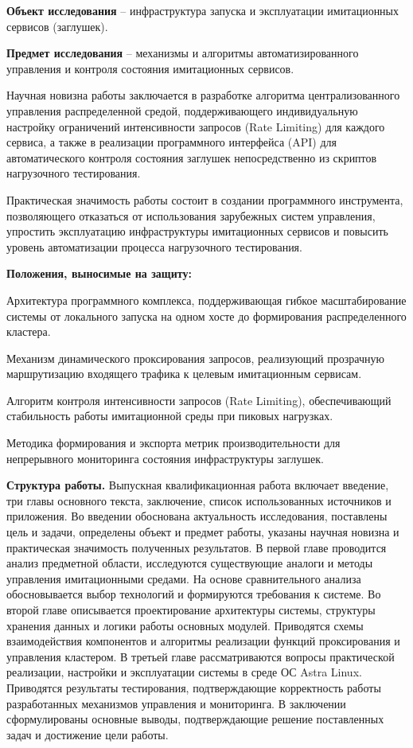 \textbf{Объект исследования} -- инфраструктура запуска и эксплуатации имитационных сервисов (заглушек).

\textbf{Предмет исследования} -- механизмы и алгоритмы автоматизированного управления и контроля состояния имитационных сервисов.

Научная новизна работы заключается в разработке алгоритма централизованного управления распределенной средой, поддерживающего индивидуальную настройку ограничений интенсивности запросов (Rate Limiting) для каждого сервиса, а также в реализации программного интерфейса (API) для автоматического контроля состояния заглушек непосредственно из скриптов нагрузочного тестирования.

Практическая значимость работы состоит в создании программного инструмента, позволяющего отказаться от использования зарубежных систем управления, упростить эксплуатацию инфраструктуры имитационных сервисов и повысить уровень автоматизации процесса нагрузочного тестирования.

\textbf{Положения, выносимые на защиту:}
\begin{compactlist}
  \item Архитектура программного комплекса, поддерживающая гибкое масштабирование системы от локального запуска на одном хосте до формирования распределенного кластера.
  \item Механизм динамического проксирования запросов, реализующий прозрачную маршрутизацию входящего трафика к целевым имитационным сервисам.
  \item Алгоритм контроля интенсивности запросов (Rate Limiting), обеспечивающий стабильность работы имитационной среды при пиковых нагрузках.
  \item Методика формирования и экспорта метрик производительности для непрерывного мониторинга состояния инфраструктуры заглушек.
\end{compactlist}

\textbf{Структура работы.} Выпускная квалификационная работа включает введение, три главы основного текста, заключение, список использованных источников и приложения.
Во введении обоснована актуальность исследования, поставлены цель и задачи, определены объект и предмет работы, указаны научная новизна и практическая значимость полученных результатов.
В первой главе проводится анализ предметной области, исследуются существующие аналоги и методы управления имитационными средами. На основе сравнительного анализа обосновывается выбор технологий и формируются требования к системе.
Во второй главе описывается проектирование архитектуры системы, структуры хранения данных и логики работы основных модулей. Приводятся схемы взаимодействия компонентов и алгоритмы реализации функций проксирования и управления кластером.
В третьей главе рассматриваются вопросы практической реализации, настройки и эксплуатации системы в среде ОС Astra Linux. Приводятся результаты тестирования, подтверждающие корректность работы разработанных механизмов управления и мониторинга.
В заключении сформулированы основные выводы, подтверждающие решение поставленных задач и достижение цели работы.
